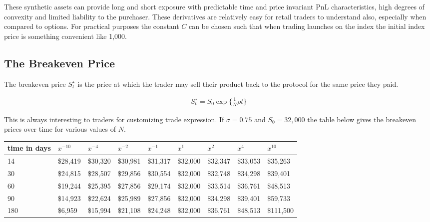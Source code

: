 \documentclass[12pt]{article}
\begin{document}
    These synthetic assets can provide long and short exposure with predictable time and price invariant PnL characteristics, high degrees of convexity and limited liability to the purchaser. These derivatives are relatively easy for retail traders to understand also, especially when compared to options. For practical purposes the constant $C$ can be chosen such that when trading launches on the index the initial index price is something convenient like 1,000.

    \subsection{The Breakeven Price}

    The breakeven price $S^\star_t$ is the price at which the trader may sell their product back to the protocol for the same price they paid.

    \begin{align*}
        S^{\star}_t = S_0 \exp \{\tfrac{1}{N} \rho t\}
    \end{align*}

    This is always interesting to traders for customizing trade expression. If $\sigma = 0.75$ and $S_0=32,000$ the table below gives the breakeven prices over time for various values of $N$.

    \begin{center}
        \begin{tabular}{l||l|l|l|l|l|l|l|l}
            time in days & $x^{-10}$ & $x^{-4}$ & $x^{-2}$ & $x^{-1}$ & $x^{1}$  & $x^{2}$  & $x^{4}$  & $x^{10}$  \\ \hline \hline
            14           & \$28,419  & \$30,320 & \$30,981 & \$31,317 & \$32,000 & \$32,347 & \$33,053 & \$35,263  \\ \hline
            30           & \$24,815  & \$28,507 & \$29,856 & \$30,554 & \$32,000 & \$32,748 & \$34,298 & \$39,401  \\ \hline
            60           & \$19,244  & \$25,395 & \$27,856 & \$29,174 & \$32,000 & \$33,514 & \$36,761 & \$48,513  \\ \hline
            90           & \$14,923  & \$22,624 & \$25,989 & \$27,856 & \$32,000 & \$34,298 & \$39,401 & \$59,733  \\ \hline
            180          & \$6,959   & \$15,994 & \$21,108 & \$24,248 & \$32,000 & \$36,761 & \$48,513 & \$111,500
        \end{tabular}
    \end{center}
\end{document}
